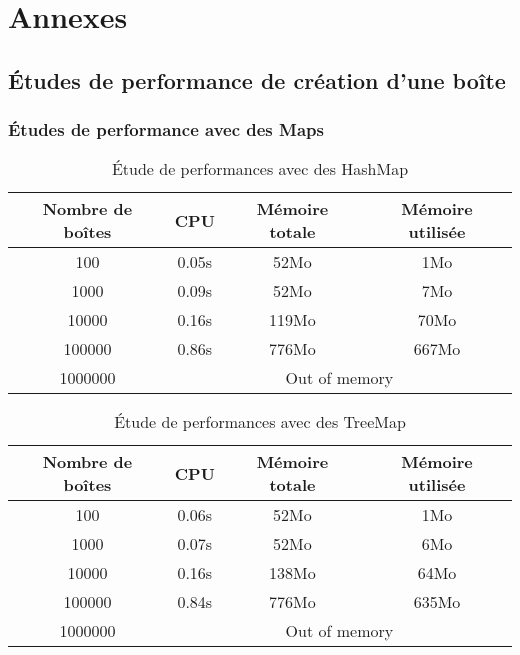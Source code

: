 
\section{Annexes}
\subsection{Études de performance de création d'une boîte}
\subsubsection{Études de performance avec des Maps}

\begin{table}[htpb]
  \centering
\begin{tabular}{|c|c|c|c|}
\hline
Nombre de boîtes & CPU & Mémoire totale & Mémoire utilisée\\
\hline
100 & 0.05s & 52Mo & 1Mo\\
\hline
1000 & 0.09s & 52Mo & 7Mo\\
\hline
10000 & 0.16s & 119Mo & 70Mo\\
\hline
100000 & 0.86s & 776Mo & 667Mo\\
\hline
1000000 & \multicolumn{3}{|c|}{Out of memory}\\
\hline
\end{tabular}
\caption{Étude de performances avec des HashMap}
\label{tab:hashmap1}
\end{table}

\begin{table}[htbp]
  \centering
\begin{tabular}{|c|c|c|c|}
\hline
Nombre de boîtes & CPU & Mémoire totale & Mémoire utilisée\\
\hline
100 & 0.06s & 52Mo & 1Mo\\
\hline
1000 & 0.07s & 52Mo & 6Mo\\
\hline
10000 & 0.16s & 138Mo & 64Mo\\
\hline
100000 & 0.84s & 776Mo & 635Mo\\
\hline
1000000 & \multicolumn{3}{|c|}{Out of memory}\\
\hline
\end{tabular}
\caption{Étude de performances avec des TreeMap}
\label{tab:treemap1}
\end{table}


